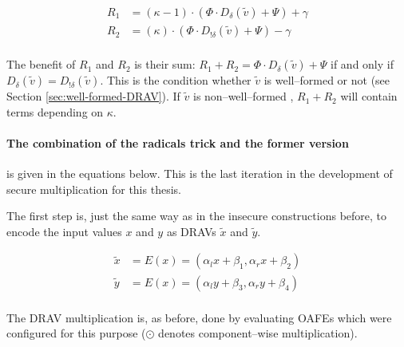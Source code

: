 \begin{align*}
  R_1 & = (\kappa -1)\cdot(\Phi \cdot D_\delta(\widetilde{v})+\Psi) + \gamma \\
  R_2 & = (\kappa)\cdot(\Phi \cdot D_{!\delta}(\widetilde{v})+\Psi) - \gamma \\
\end{align*}

\noindent{}The benefit of $R_1$ and $R_2$ is their sum: $R_1 + R_2 = \Phi \cdot
D_\delta(\widetilde{v}) + \Psi$ if and only if $D_\delta(\widetilde{v}) =
D_{!\delta}(\widetilde{v})$. This is the condition whether $\widetilde{v}$ is
well--formed or not (see Section \ref{sec:well-formed-DRAV}).  If
$\widetilde{v}$ is non--well--formed , $R_1 + R_2$ will contain terms depending
on $\kappa$.

\paragraph{The combination of the radicals trick and the former version} is
given in the equations below. This is the last iteration in the development of
secure multiplication for this thesis.

The first step is, just the same way as in the insecure constructions
before, to encode the input values $x$ and $y$ as DRAVs $\widetilde{x}$ and
$\widetilde{y}$.

\begin{align*}
  \widetilde{x} & = E(x) = (\alpha_l x + \beta_1, \alpha_r x + \beta_2) \\
  \widetilde{y} & = E(x) = (\alpha_l y + \beta_3, \alpha_r y + \beta_4) \\
\end{align*}

\noindent{}The DRAV multiplication is, as before, done by evaluating OAFEs which
were configured for this purpose ($\odot$ denotes component--wise
multiplication).

